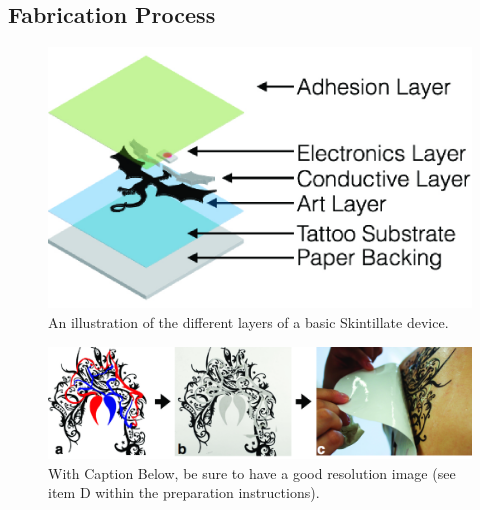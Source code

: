 \documentclass{sigchi}
\begin{document}
\subsection{Fabrication Process}
\begin{figure}[!h]
\centering
\includegraphics[width=0.9\columnwidth]{figures/Figure3}
\caption{An illustration of the different layers of a basic Skintillate device.}
\label{fig:figure3}
\end{figure}

\begin{figure}[!h]
\centering
\includegraphics[width=1.0\textwidth]{figures/Figure4}
\caption{With Caption Below, be sure to have a good resolution image
  (see item D within the preparation instructions).}
\label{fig:figure4}
\end{figure}
\end{document}
